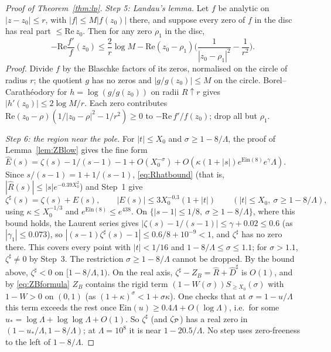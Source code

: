 \begin{proof}[Proof of Theorem~\ref{thm:lp}]
\emph{Step 5: Landau's lemma.} Let $f$ be analytic on $|z-z_0|\le r$, with $|f|\le M|f(z_0)|$ there, and suppose every zero
of $f$ in the disc has real part $\le\mathrm{Re}\,z_0$. Then for any zero $\rho_1$ in the disc,
\[
  -\mathrm{Re}\frac{f'}f(z_0)\le\frac2r\log M-\mathrm{Re}(z_0-\rho_1)\Big(\frac1{|z_0-\rho_1|^2}-\frac1{r^2}\Big).
\]
\emph{Proof.} Divide $f$ by the Blaschke factors of its zeros, normalised on the circle of radius $r$; the quotient $g$ has
no zeros and $|g/g(z_0)|\le M$ on the circle. Borel--Carath\'eodory for $h=\log(g/g(z_0))$ on radii $R\uparrow r$ gives
$|h'(z_0)|\le2\log M/r$. Each zero contributes $\mathrm{Re}(z_0-\rho)(1/|z_0-\rho|^2-1/r^2)\ge0$ to $-\mathrm{Re}\,f'/f(z_0)$;
drop all but $\rho_1$.

\emph{Step 6: the region near the pole.} For $|t|\le X_0$ and $\sigma\ge1-8/\Lambda$, the proof of
Lemma~\ref{lem:ZBlow} gives the fine form
$\hat E(s)=\zeta(s)-1/(s-1)-1+O(X_0^{-\sigma})+O(\kappa(1+|s|)e^{\mathrm{Ein}(8)}e^\gamma\Lambda)$. Since
$s/(s-1)=1+1/(s-1)$, \eqref{eq:Rhatbound} (that is, $|\hat R(s)|\le|s|e^{-0.39X_0^2}$) and Step~1 give
\[
  \zeta^\sharp(s)=\zeta(s)+E(s),\qquad|E(s)|\le3X_0^{-0.3}(1+|t|)\qquad(|t|\le X_0,\ \sigma\ge1-8/\Lambda),
\]
using $\kappa\le X_0^{-1/3}$ and $e^{\mathrm{Ein}(8)}\le e^{438}$. On $\{|s-1|\le1/8,\ \sigma\ge1-8/\Lambda\}$, where this bound
holds, the Laurent series gives
$|\zeta(s)-1/(s-1)|\le\gamma+0.02\le0.6$ (as $|\gamma_1|\le0.073$), so $|(s-1)\zeta^\sharp(s)-1|\le0.6/8+10^{-9}<1$, and
$\zeta^\sharp$ has no zero there. This covers every point with $|t|<1/16$ and $1-8/\Lambda\le\sigma\le1.1$; for
$\sigma>1.1$, $\zeta^\sharp\ne0$ by Step~3. The restriction $\sigma\ge1-8/\Lambda$ cannot be dropped. By the bound above,
$\zeta^\sharp<0$ on $[1-8/\Lambda,1)$. On the real axis, $\zeta^\sharp-Z_B=\hat R+\hat D^\sharp$ is $O(1)$, and by
\eqref{eq:ZBformula} $Z_B$ contains the rigid term $(1-W(\sigma))S_{\ge X_0}(\sigma)$ with $1-W>0$ on $(0,1)$ (as
$(1+\kappa)^\sigma<1+\sigma\kappa$). One checks that at $\sigma=1-u/\Lambda$ this term exceeds the rest once
$\mathrm{Ein}(u)\ge0.4\Lambda+O(\log\Lambda)$, i.e.\ for some $u_*=\log\Lambda+\log\log\Lambda+O(1)$. So $\zeta^\sharp$ (and $\zeta_{\mathcal{P}}$)
has a real zero in $(1-u_*/\Lambda,1-8/\Lambda)$; at $\Lambda=10^8$ it is near $1-20.5/\Lambda$. No step uses zero-freeness to the
left of $1-8/\Lambda$.


\end{proof}
